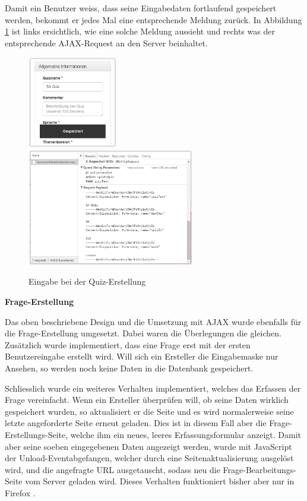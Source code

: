 Damit ein Benutzer weiss, dass seine Eingabedaten fortlaufend gespeichert werden, bekommt er jedes Mal eine entsprechende Meldung zurück. In Abbildung \ref{fig:Eingabe bei der Quiz-Erstellung} ist links ersichtlich, wie eine solche Meldung aussieht und rechts was der entsprechende \acrshort{AJAX}-Request an den Server beinhaltet.


\begin{figure}
	\includegraphics[width=0.35\textwidth]{Images/Quiz_Erstellen_Gespeichert.PNG}
	\includegraphics[width=0.65\textwidth]{Images/Quiz_Erstellen_Request.PNG}
	\caption{Eingabe bei der Quiz-Erstellung}
	\label{fig:Eingabe bei der Quiz-Erstellung}
\end{figure}

\bigskip\bigskip

\textbf{Frage-Erstellung}

\bigskip

Das oben beschriebene Design und die Umsetzung mit AJAX wurde ebenfalls für die Frage-Erstellung umgesetzt. Dabei waren die Überlegungen die gleichen. \\

Zusätzlich wurde implementiert, dass eine Frage erst mit der ersten Benutzereingabe erstellt wird. Will sich ein Ersteller die Eingabemaske nur Ansehen, so werden noch keine Daten in die Datenbank gespeichert.

Schliesslich wurde ein weiteres Verhalten implementiert, welches das Erfassen der Frage vereinfacht. Wenn ein Ersteller überprüfen will, ob seine Daten wirklich gespeichert wurden, so aktualisiert er die Seite und es wird normalerweise seine letzte angeforderte Seite erneut geladen. Dies ist in diesem Fall aber die Frage-Erstellungs-Seite, welche ihm ein neues, leeres Erfassungsformular anzeigt. Damit aber seine soeben eingegebenen Daten angezeigt werden, wurde mit JavaScript der \glqq Unload-Event\grqq abgefangen, welcher durch eine Seitenaktualisierung ausgelöst wird, und die angefragte \gls{URL} ausgetauscht, sodass neu die Frage-Bearbeitungs-Seite vom Server geladen wird.
Dieses Verhalten funktioniert bisher aber nur in Firefox \cite{firefox}.



